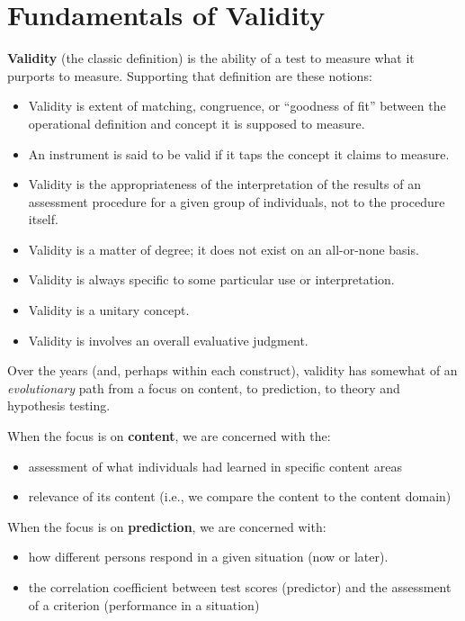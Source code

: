 \documentclass[
  english,
]{book}
\providecommand{\tightlist}{%
  \setlength{\itemsep}{0pt}\setlength{\parskip}{0pt}}
\begin{document}
\hypertarget{fundamentals-of-validity}{%
\section{Fundamentals of Validity}\label{fundamentals-of-validity}}

\textbf{Validity} (the classic definition) is the ability of a test to measure what it purports to measure. Supporting that definition are these notions:

\begin{itemize}
\tightlist
\item
  Validity is extent of matching, congruence, or ``goodness of fit'' between the operational definition and concept it is supposed to measure.
\item
  An instrument is said to be valid if it taps the concept it claims to measure.
\item
  Validity is the appropriateness of the interpretation of the results of an assessment procedure for a given group of individuals, not to the procedure itself.
\item
  Validity is a matter of degree; it does not exist on an all-or-none basis.
\item
  Validity is always specific to some particular use or interpretation.
\item
  Validity is a unitary concept.
\item
  Validity is involves an overall evaluative judgment.
\end{itemize}

Over the years (and, perhaps within each construct), validity has somewhat of an \emph{evolutionary} path from a focus on content, to prediction, to theory and hypothesis testing.

When the focus is on \textbf{content}, we are concerned with the:

\begin{itemize}
\tightlist
\item
  assessment of what individuals had learned in specific content areas
\item
  relevance of its content (i.e., we compare the content to the content domain)
\end{itemize}

When the focus is on \textbf{prediction}, we are concerned with:

\begin{itemize}
\tightlist
\item
  how different persons respond in a given situation (now or later).
\item
  the correlation coefficient between test scores (predictor) and the assessment of a criterion (performance in a situation)
\end{itemize}
\end{document}
